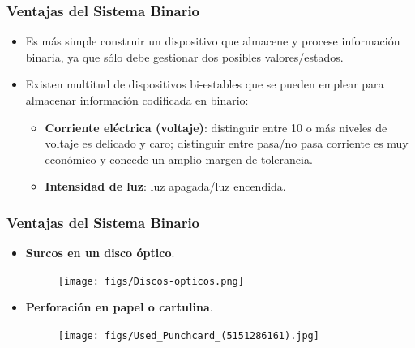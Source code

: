 \documentclass[aspectratio=169]{beamer}
\begin{document}
\begin{frame}[fragile]\frametitle{Ventajas del Sistema Binario}
\begin{itemize}
	\item Es más simple construir un dispositivo que almacene y procese información binaria, ya que sólo debe gestionar dos posibles valores/estados.

\item Existen multitud de dispositivos bi-estables que se pueden emplear para almacenar información codificada en binario:
\begin{itemize}
	\item \textbf{Corriente eléctrica (voltaje)}: distinguir entre 10 o más niveles de voltaje es delicado y caro; distinguir entre pasa/no pasa corriente es muy económico y concede un amplio margen de tolerancia.
	\item \textbf{Intensidad de luz}: luz apagada/luz encendida.
\end{itemize}
\end{itemize}
\end{frame}
\begin{frame}[fragile]\frametitle{Ventajas del Sistema Binario}
\begin{itemize}
	\item \textbf{Surcos en un disco óptico}.
	\begin{figure}
	\begin{center}
	\texttt{[image: figs/Discos-opticos.png]}\hspace{1cm}	
	\end{center}
	\end{figure}
	\item \textbf{Perforación en papel o cartulina}.
	\begin{figure}
	\begin{center}
	\texttt{[image: figs/Used\_Punchcard\_(5151286161).jpg]}\hspace{1cm}	
	\end{center}
	\end{figure}
\end{itemize}
\end{frame}
\end{document}

